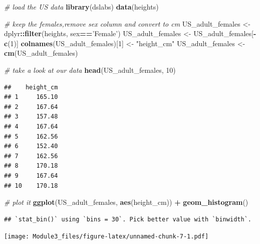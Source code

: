 \documentclass[]{book}
\newenvironment{Shaded}{\begin{snugshade}}{\end{snugshade}}
\newcommand{\KeywordTok}[1]{\textcolor[rgb]{0.13,0.29,0.53}{\textbf{#1}}}
\newcommand{\DecValTok}[1]{\textcolor[rgb]{0.00,0.00,0.81}{#1}}
\newcommand{\StringTok}[1]{\textcolor[rgb]{0.31,0.60,0.02}{#1}}
\newcommand{\CommentTok}[1]{\textcolor[rgb]{0.56,0.35,0.01}{\textit{#1}}}
\newcommand{\OperatorTok}[1]{\textcolor[rgb]{0.81,0.36,0.00}{\textbf{#1}}}
\newcommand{\NormalTok}[1]{#1}
\theoremstyle{definition}
\theoremstyle{definition}
\theoremstyle{definition}
\theoremstyle{remark}
\begin{document}
\begin{Shaded}
\begin{Highlighting}[]
\CommentTok{# load the US data }
\KeywordTok{library}\NormalTok{(dslabs)}
\KeywordTok{data}\NormalTok{(heights)}

\CommentTok{# keep the females,remove sex column and convert to cm}
\NormalTok{US_adult_females <-}\StringTok{ }\NormalTok{dplyr}\OperatorTok{::}\KeywordTok{filter}\NormalTok{(heights, sex}\OperatorTok{==}\StringTok{'Female'}\NormalTok{)}
\NormalTok{US_adult_females <-}\StringTok{ }\NormalTok{US_adult_females[}\OperatorTok{-}\KeywordTok{c}\NormalTok{(}\DecValTok{1}\NormalTok{)]}
\KeywordTok{colnames}\NormalTok{(US_adult_females)[}\DecValTok{1}\NormalTok{] <-}\StringTok{ "height_cm"}
\NormalTok{US_adult_females <-}\StringTok{ }\KeywordTok{cm}\NormalTok{(US_adult_females)}

\CommentTok{# take a look at our data}
\KeywordTok{head}\NormalTok{(US_adult_females, }\DecValTok{10}\NormalTok{)}
\end{Highlighting}
\end{Shaded}

\begin{verbatim}
##    height_cm
## 1     165.10
## 2     167.64
## 3     157.48
## 4     167.64
## 5     162.56
## 6     152.40
## 7     162.56
## 8     170.18
## 9     167.64
## 10    170.18
\end{verbatim}

\begin{Shaded}
\begin{Highlighting}[]
\CommentTok{# plot it}
\KeywordTok{ggplot}\NormalTok{(US_adult_females, }\KeywordTok{aes}\NormalTok{(height_cm)) }\OperatorTok{+}\StringTok{ }
\StringTok{  }\KeywordTok{geom_histogram}\NormalTok{()}
\end{Highlighting}
\end{Shaded}

\begin{verbatim}
## `stat_bin()` using `bins = 30`. Pick better value with `binwidth`.
\end{verbatim}

\texttt{[image: Module3\_files/figure-latex/unnamed-chunk-7-1.pdf]}
\end{document}

